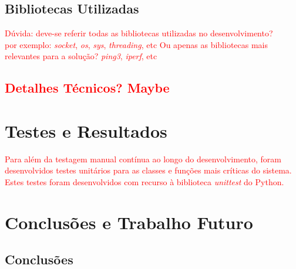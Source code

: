\documentclass[a4paper,12pt]{scrreprt}
\begin{document}
\section{Bibliotecas Utilizadas}

\textcolor{red}{
    Dúvida: deve-se referir todas as bibliotecas utilizadas no desenvolvimento? \\
    por exemplo: \textit{socket}, \textit{os}, \textit{sys}, \textit{threading}, etc
    Ou apenas as bibliotecas mais relevantes para a solução? \textit{ping3}, \textit{iperf}, etc
}

\section{\textcolor{red}{Detalhes Técnicos? Maybe}}



\chapter{Testes e Resultados}

\textcolor{red}{
    Para além da testagem manual contínua ao longo do desenvolvimento, foram
    desenvolvidos testes unitários para as classes e funções mais críticas do
    sistema. Estes testes foram desenvolvidos com recurso à biblioteca
    \textit{unittest} do Python.
}



\chapter{Conclusões e Trabalho Futuro}

\section{Conclusões}
\end{document}
